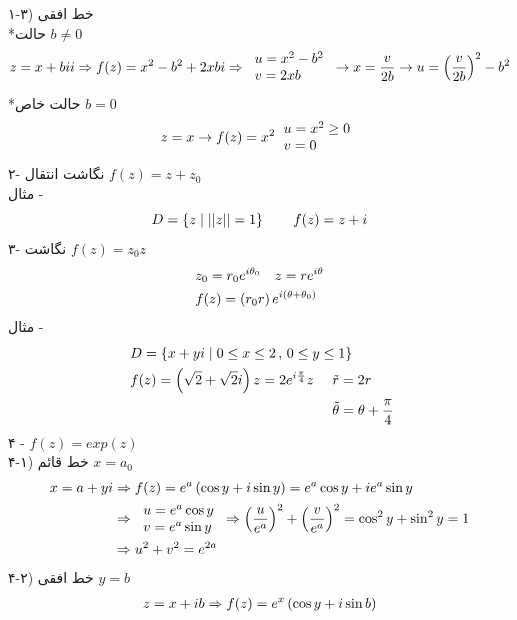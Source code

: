 ۱-۳) خط افقی\\
*حالت $b\ne0$
\[\begin{aligned}
	z=x+bii\Rightarrow f(z)=x^2-b^2+2xbi \Rightarrow
	\begin{tabular}{l}
		$u=x^2-b^2$
		\\
		$v=2xb$
	\end{tabular}\rightarrow x=\frac v{2b}
	\rightarrow u=\pr{\frac v{2b}}^2-b^2
\end{aligned}\]
*حالت خاص $b=0$
\[
	z=x\rightarrow f(z)=x^2
\begin{tabular}{l}
	$u=x^2\ge0$
	\\
	$v=0$
\end{tabular}
\]
۲- نگاشت انتقال
$f(z)=z+z_0$
\\
مثال -
\[
D=\left\{z\mid\left|\left| z \right|\right|=1\right\} \qquad f(z)=z+i
\]
۳- نگاشت
$f(z)=z_0z$
\[\begin{aligned}
	& z_0=r_0e^{i\theta_0} \quad z=re^{i\theta}
	\\ &
	f(z)=\left(r_0r\right)e^{i\left(\theta+\theta_0\right)}
\end{aligned}\]
مثال -
\[\begin{aligned}
	&\ D=\left\{x+yi\mid0\le x\le 2 \, , \, 0\le y\le1\right\}
	\\ &\
	\begin{aligned}
	f(z)=\left(\sqrt2+\sqrt2i\right)z=2e^{i\frac\pi4}z\quad &\ \tilde{r}=2r
	\\ &\
	\tilde{\theta}=\theta+\frac\pi4
	\end{aligned}
\end{aligned}\]
۴ -
$f(z)=exp(z)$\\
۴-۱) خط قائم
$x=a_0$
\[\begin{aligned}
	x=a+yi & \Rightarrow f(z)=e^a\pr{\cos y+i\sin y}=e^a\cos y+ie^a\sin y
	\\ & 
	\Rightarrow \begin{tabular}{l}
		$u=e^a\cos y$
		\\
		$v=e^a\sin y$
	\end{tabular}\Rightarrow
	\pr{ \frac u{e^a}}^2+\pr{\frac v{e^a}}^2=\cos^2 y+\sin^2 y=1
	\\ &
	\Rightarrow
	u^2+v^2=e^{2a}
\end{aligned}\]
۴-۲) خط افقی
$y=b$
\[\begin{aligned}
	z=x+ib\Rightarrow f(z)=e^x\left(\cos y+i\sin b\right)
\end{aligned}\]
